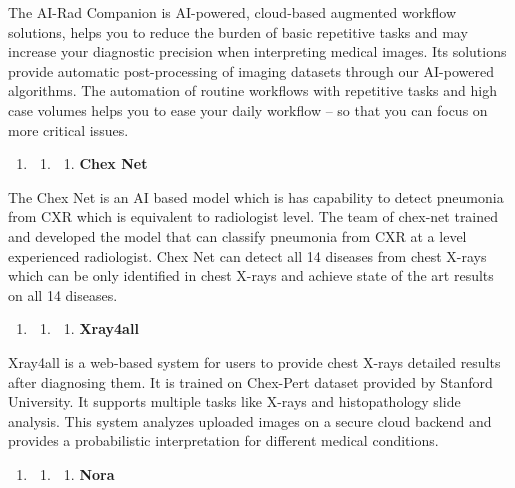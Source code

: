 \documentclass{article} %
\begin{document}
\noindent The AI-Rad Companion is AI-powered, cloud-based augmented workflow solutions, helps you to reduce the burden of basic repetitive tasks and may increase your diagnostic precision when interpreting medical images. Its solutions provide automatic post-processing of imaging datasets through our AI-powered algorithms. The automation of routine workflows with repetitive tasks and high case volumes helps you to ease your daily workflow -- so that you can focus on more critical issues.

\begin{enumerate}
\item \begin{enumerate}
\item \begin{enumerate}
\item  \textbf{Chex Net}
\end{enumerate}
\end{enumerate}
\end{enumerate}

\noindent The Chex Net is an AI based model which is has capability to detect pneumonia from CXR which is equivalent to radiologist level. The team of chex-net trained and developed the model that can classify pneumonia from CXR at a level experienced radiologist. Chex Net can detect all 14 diseases from chest X-rays which can be only identified in chest X-rays and achieve state of the art results on all 14 diseases.

\begin{enumerate}
\item \begin{enumerate}
\item \begin{enumerate}
\item  \textbf{Xray4all}
\end{enumerate}
\end{enumerate}
\end{enumerate}

\noindent Xray4all is a web-based system for users to provide chest X-rays detailed results after diagnosing them. It is trained on Chex-Pert dataset provided by Stanford University.  It supports multiple tasks like X-rays and histopathology slide analysis. This system analyzes uploaded images on a secure cloud backend and provides a probabilistic interpretation for different medical conditions. 

\begin{enumerate}
\item \begin{enumerate}
\item \begin{enumerate}
\item  \textbf{Nora}
\end{enumerate}
\end{enumerate}
\end{enumerate}
\end{document}
